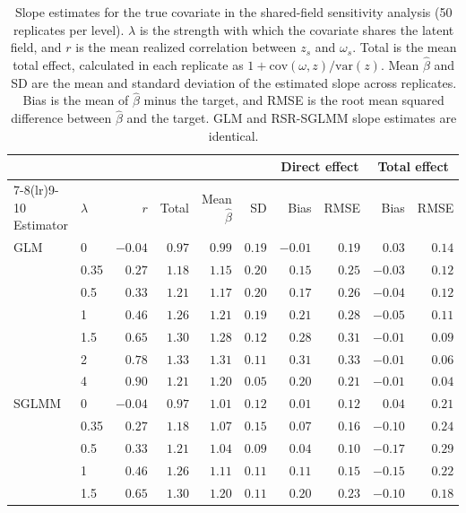 
\begin{table}[ht]
\centering
\small
\caption{Slope estimates for the true covariate in the shared-field sensitivity analysis (50 replicates per level). $\lambda$ is the strength with which the covariate shares the latent field, and $r$ is the mean realized correlation between $z_s$ and $\omega_s$. Total is the mean total effect, calculated in each replicate as $1 + \mathrm{cov}(\omega, z)/\mathrm{var}(z)$. Mean $\hat{\beta}$ and SD are the mean and standard deviation of the estimated slope across replicates. Bias is the mean of $\hat{\beta}$ minus the target, and RMSE is the root mean squared difference between $\hat{\beta}$ and the target. GLM and RSR-SGLMM slope estimates are identical.}
\label{tab:si_shared_slope}
\begin{tabular}{llrrrrrrrr}
\toprule
 & & & & & & \multicolumn{2}{c}{Direct effect} & \multicolumn{2}{c}{Total effect} \\
\cmidrule(lr){7-8}\cmidrule(lr){9-10}
Estimator & $\lambda$ & $r$ & Total & Mean $\hat{\beta}$ & SD & Bias & RMSE & Bias & RMSE \\
\midrule
GLM & 0 & $-0.04$ & $0.97$ & $0.99$ & $0.19$ & $-0.01$ & $0.19$ & $0.03$ & $0.14$ \\
 & 0.35 & $0.27$ & $1.18$ & $1.15$ & $0.20$ & $0.15$ & $0.25$ & $-0.03$ & $0.12$ \\
 & 0.5 & $0.33$ & $1.21$ & $1.17$ & $0.20$ & $0.17$ & $0.26$ & $-0.04$ & $0.12$ \\
 & 1 & $0.46$ & $1.26$ & $1.21$ & $0.19$ & $0.21$ & $0.28$ & $-0.05$ & $0.11$ \\
 & 1.5 & $0.65$ & $1.30$ & $1.28$ & $0.12$ & $0.28$ & $0.31$ & $-0.01$ & $0.09$ \\
 & 2 & $0.78$ & $1.33$ & $1.31$ & $0.11$ & $0.31$ & $0.33$ & $-0.01$ & $0.06$ \\
 & 4 & $0.90$ & $1.21$ & $1.20$ & $0.05$ & $0.20$ & $0.21$ & $-0.01$ & $0.04$ \\
\addlinespace
SGLMM & 0 & $-0.04$ & $0.97$ & $1.01$ & $0.12$ & $0.01$ & $0.12$ & $0.04$ & $0.21$ \\
 & 0.35 & $0.27$ & $1.18$ & $1.07$ & $0.15$ & $0.07$ & $0.16$ & $-0.10$ & $0.24$ \\
 & 0.5 & $0.33$ & $1.21$ & $1.04$ & $0.09$ & $0.04$ & $0.10$ & $-0.17$ & $0.29$ \\
 & 1 & $0.46$ & $1.26$ & $1.11$ & $0.11$ & $0.11$ & $0.15$ & $-0.15$ & $0.22$ \\
 & 1.5 & $0.65$ & $1.30$ & $1.20$ & $0.11$ & $0.20$ & $0.23$ & $-0.10$ & $0.18$ \\

\end{tabular}
\end{table}
